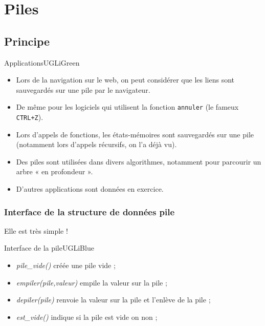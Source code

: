 \documentclass[10pt,cours,firamath,a4paper]{nsi}
\begin{document}
\chapter{Piles}
\section{Principe}

\begin{encadrecolore}{Applications}{UGLiGreen}
	\begin{itemize}
		\item 	Lors de la navigation sur le web, on peut considérer que les liens sont sauvegardés sur une pile par le navigateur.
		\item 	De même pour les logiciels qui utilisent la fonction \texttt{annuler} (le fameux \texttt{CTRL+Z}).
		\item	Lors d'appels de fonctions, les états-mémoires sont sauvegardés sur une pile (notamment lors d'appels récursifs, on l'a déjà vu).
		\item 	Des piles sont utilisées dans divers algorithmes, notamment pour parcourir un arbre « en profondeur ».
		\item 	D'autres applications sont données en exercice.
	\end{itemize}
\end{encadrecolore}


\subsection{Interface de la structure de données pile}

Elle est très simple !
\begin{encadrecolore}{Interface de la pile}{UGLiBlue}
	\begin{itemize}
		\item \textit{pile\_vide()} créée une pile vide ;
		\item \textit{empiler(pile,valeur)} empile la valeur sur la pile ;
		\item  \textit{depiler(pile)} renvoie la valeur sur la pile et l'enlève de la pile ;
		\item \textit{est\_vide()} indique si la pile est vide on non ;
	\end{itemize}
\end{encadrecolore}
\end{document}

